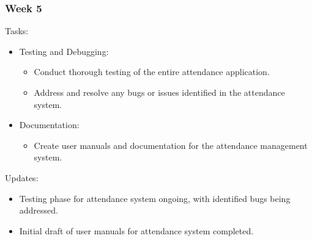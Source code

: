\documentclass[a4paper, 12pt]{article}
\begin{document}
\subsubsection{Week 5}
Tasks:
\begin{itemize}
    \item Testing and Debugging:
    \begin{itemize}
        \item Conduct thorough testing of the entire attendance application.
        \item Address and resolve any bugs or issues identified in the attendance system.
    \end{itemize}
    \item Documentation:
    \begin{itemize}
        \item Create user manuals and documentation for the attendance management system.
    \end{itemize}
\end{itemize}
Updates:
\begin{itemize}
    \item Testing phase for attendance system ongoing, with identified bugs being addressed.
    \item Initial draft of user manuals for attendance system completed.
\end{itemize}
\end{document}

